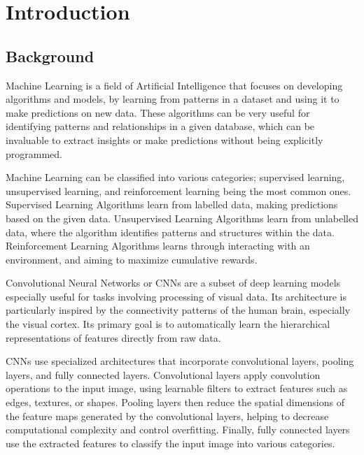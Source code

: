
\chapter{Introduction}

\section{Background}
Machine Learning is a field of Artificial Intelligence that focuses on developing algorithms and models, by learning from patterns in a dataset and using it to make predictions on new data. These algorithms can be very useful for identifying patterns and relationships in a given database, which can be invaluable to extract insights or make predictions without being explicitly programmed.\par \vspace{1em}
Machine Learning can be classified into various categories; supervised learning, unsupervised learning, and reinforcement learning being the most common ones. Supervised Learning Algorithms learn from labelled data, making predictions based on the given data. Unsupervised Learning Algorithms learn from unlabelled data, where the algorithm identifies patterns and structures within the data. Reinforcement Learning Algorithms learns through interacting with an environment, and aiming to maximize cumulative rewards.\par \vspace{1em}
Convolutional Neural Networks or CNNs are a subset of deep learning models especially useful for tasks involving processing of visual data. Its architecture is particularly inspired by the connectivity patterns of the human brain, especially the visual cortex. Its primary goal is to automatically learn the hierarchical representations of features directly from raw data.\par \vspace{1em} \newpage
CNNs use specialized architectures that incorporate convolutional layers, pooling layers, and fully connected layers. Convolutional layers apply convolution operations to the input image, using learnable filters to extract features such as edges, textures, or shapes. Pooling layers then reduce the spatial dimensions of the feature maps generated by the convolutional layers, helping to decrease computational complexity and control overfitting. Finally, fully connected layers use the extracted features to classify the input image into various categories.\par \vspace{1em}

